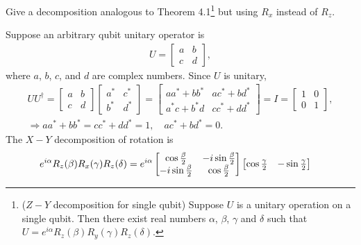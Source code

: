 \documentclass[en]{sol-man}
\begin{document}
\begin{exe}
    Give a decomposition analogous to Theorem 4.1\footnote{\label{Thm-4.1-Z-Y-decomp-for-a-single-qubit}($Z-Y$ decomposition for single qubit) Suppose $U$ is a unitary operation on a single qubit. Then there exist real numbers $\alpha$, $\beta$, $\gamma$ and $\delta$ such that $U=e^{i\alpha}R_z(\beta)R_y(\gamma)R_z(\delta)$.} but using $R_x$ instead of $R_z$.
\end{exe}
\begin{sol}
    Suppose an arbitrary qubit unitary operator is
    \begin{align}
        U=\begin{bmatrix}
            a&b\\
            c&d
        \end{bmatrix},
    \end{align}
    where $a$, $b$, $c$, and $d$ are complex numbers. Since $U$ is unitary,
    \begin{gather}
        UU^{\dagger}=\begin{bmatrix}
            a&b\\
            c&d
        \end{bmatrix}\begin{bmatrix}
            a^*&c^*\\
            b^*&d^*
        \end{bmatrix}=\begin{bmatrix}
            aa^*+bb^*&ac^*+bd^*\\
            a^*c+b^*d&cc^*+dd^*
        \end{bmatrix}=I=\begin{bmatrix}
            1&0\\
            0&1
        \end{bmatrix},\\
        \Longrightarrow aa^*+bb^*=cc^*+dd^*=1,\quad ac^*+bd^*=0.
    \end{gather}
    The $X-Y$ decomposition of rotation is
    \begin{align}
        \notag&e^{i\alpha}R_z(\beta)R_x(\gamma)R_z(\delta)=e^{i\alpha}\begin{bmatrix}
            \cos\frac{\beta}{2}&-i\sin\frac{\beta}{2}\\
            -i\sin\frac{\beta}{2}&\cos\frac{\beta}{2}
        \end{bmatrix}\begin{bmatrix}
            \cos\frac{\gamma}{2}&-\sin\frac{\gamma}{2}\\

\end{bmatrix}
\end{align}
\end{sol}
\end{document}
